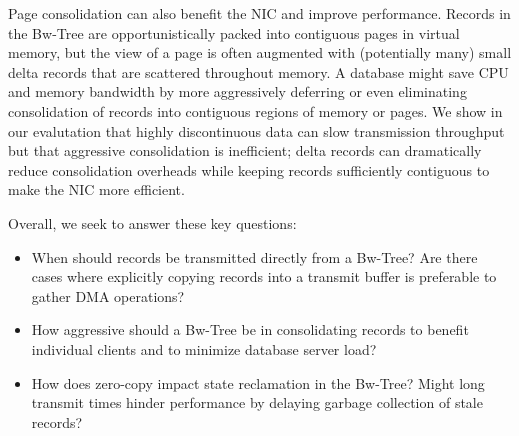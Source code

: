 Page consolidation can also benefit the NIC and improve performance.  Records
in the Bw-Tree are opportunistically packed into contiguous pages in virtual
memory, but the view of a page is often augmented with (potentially many)
small delta
records that are scattered throughout memory.
A database might save CPU and memory bandwidth by more
aggressively deferring or even eliminating consolidation of records into
contiguous regions of memory or pages. We show in
our evalutation that highly discontinuous data can slow
transmission throughput but that aggressive consolidation is inefficient; delta
records can dramatically reduce consolidation overheads while keeping records
sufficiently contiguous to make the NIC more efficient.

Overall, we seek to answer these key questions:
\begin{itemize}
\item
When should records be transmitted directly from a Bw-Tree? Are there cases
where explicitly copying records into a transmit buffer is preferable to gather
DMA operations?
\item
How aggressive should a Bw-Tree be in consolidating records to benefit individual
clients and to minimize database server load?
\item
How does zero-copy impact state reclamation in the Bw-Tree? Might long transmit
times hinder performance by delaying garbage collection of stale records?
\end{itemize}










